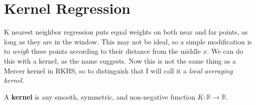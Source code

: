 \section{Kernel Regression} 

  K nearest neighbor regression puts equal weights on both near and far points, as long as they are in the window. This may not be ideal, so a simple modification is to \textit{weigh} these points according to their distance from the middle $x$. We can do this with a kernel, as the name suggests. Now this is not the same thing as a Mercer kernel in RKHS, so to distinguish that I will call it a \textit{local averaging kernel}. 

  \begin{definition}
    A \textbf{kernel} is any smooth, symmetric, and non-negative function $K : \mathbb{R} \to \mathbb{R}$.  
  \end{definition}

